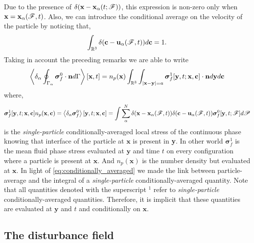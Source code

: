 Due to the presence of $\delta(\textbf{x}-\textbf{x}_\alpha(t; \mathscr{F}))$, this expression is non-zero only when $\textbf{x} = \textbf{x}_\alpha(\mathscr{F},t)$. 
Also, we can introduce the conditional average on the velocity of the particle by noticing that, 
\begin{equation*}
    \int_{\mathbb{R}^3} \delta(\textbf{c} - \textbf{u}_\alpha(\mathscr{F},t)) d\textbf{c} = 1. 
\end{equation*}
Taking in account the preceding remarks we are able to write
\begin{equation}
    \left<\delta_\alpha \oint_{\Gamma_\alpha} \bm\sigma_f^0\cdot\textbf{n} d\Gamma\right>[\textbf{x},t]
    =
    n_p(\textbf{x})
    \int_{\mathbb{R}^3}
    \int_{|\textbf{x}-\textbf{y}|=a}
    \bm\sigma_f^1[\textbf{y},t;\textbf{x},\textbf{c}] \cdot \textbf{n}
    d\textbf{y}
    d\textbf{c}
    \label{eq:conditionally_averaged}
\end{equation}
where, 
\begin{equation*}
    \bm\sigma^1_f[\textbf{y},t;\textbf{x},\textbf{c}] n_p(\textbf{x},\textbf{c})
    =
    \left<\delta_\alpha \bm\sigma^0_f\right>[\textbf{y},t;\textbf{x},\textbf{c}]
    = 
    \int 
    \sum_\alpha^N 
    \delta(\textbf{x} - \textbf{x}_\alpha(\mathscr{F},t))
    \delta(\textbf{c} - \textbf{u}_\alpha(\mathscr{F},t))
    \bm\sigma_f^0[\textbf{y},t;\mathscr{F}]
    d\mathscr{P}
\end{equation*}
is the \textit{single-particle} conditionally-averaged local stress of the continuous phase knowing that interface of the particle at $\textbf{x}$ is  present in \textbf{y}. 
In other world $\bm\sigma^1_f$ is the mean fluid phase stress evaluated at $\textbf{y}$ and time $t$ on every configuration where a particle is present at $\textbf{x}$. 
And $n_p(\textbf{x})$ is the number density but evaluated at $\textbf{x}$.
In light of \ref{eq:conditionally_averaged} we made the link between particle-average and the integral of a \textit{single-particle} conditionally-averaged quantity. 
Note that all quantities denoted with the superscript $^1$ refer to \textit{single-particle} conditionally-averaged  quantities.  
Therefore, it is implicit that these quantities are evaluated at $\textbf{y}$ and $t$ and conditionally on $\textbf{x}$. 

\subsection{The disturbance field}

